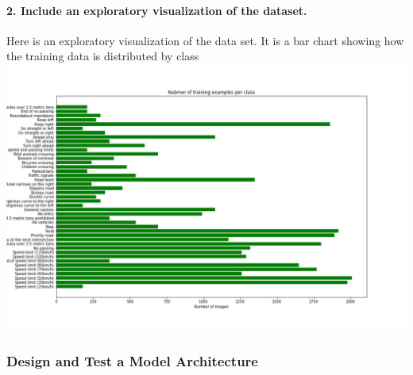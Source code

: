 \documentclass[11pt]{article}
\makeatletter
\def\maxwidth{\ifdim\Gin@nat@width>\linewidth\linewidth
    \else\Gin@nat@width\fi}
\let\Oldincludegraphics\includegraphics
\renewcommand{\includegraphics}[1]{\Oldincludegraphics[width=.8\maxwidth]{#1}}
\makeatother
\begin{document}
\hypertarget{include-an-exploratory-visualization-of-the-dataset.}{%
\paragraph{2. Include an exploratory visualization of the
dataset.}\label{include-an-exploratory-visualization-of-the-dataset.}}

Here is an exploratory visualization of the data set. It is a bar chart
showing how the training data is distributed by class
\includegraphics{Nubmer of training examples per class.jpg}

    \hypertarget{design-and-test-a-model-architecture}{%
\subsubsection{Design and Test a Model
Architecture}\label{design-and-test-a-model-architecture}}
\end{document}
